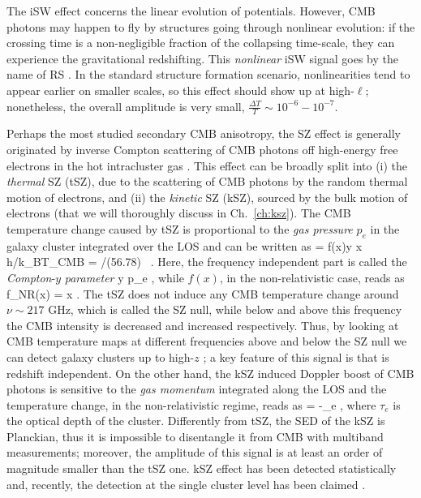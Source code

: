 The \gls{iSW} effect concerns the linear evolution of potentials. However, \gls{CMB} photons may happen 
to fly by structures going through nonlinear evolution: if the crossing time is a non-negligible fraction of the 
collapsing time-scale, they can experience the gravitational redshifting. This \emph{nonlinear} \gls{iSW} signal
goes by the name
of \gls{RS} \citep{Rees1968}. In the standard structure formation scenario, nonlinearities tend to appear earlier on smaller scales, so 
this effect should show up at high-$\ell$; nonetheless, the overall amplitude is very small, $\frac{\Delta T}{T} \sim 10^{-6}-10^{-7}$.  

Perhaps the most studied secondary \gls{CMB} anisotropy, the \gls{SZ} effect is generally originated by inverse 
Compton scattering of \gls{CMB} photons off high-energy free electrons in the hot intracluster gas \citep{Zeldovich1969,Sunyaev1970}.
This effect can be broadly split into (i) the \emph{thermal} \gls{SZ} (tSZ), due to the scattering of 
\gls{CMB} photons by the random thermal motion of electrons, and (ii) the \emph{kinetic} \gls{SZ} (kSZ),
sourced by the bulk motion of electrons (that we will thoroughly discuss in Ch.~\eqref{ch:ksz}). The 
\gls{CMB} temperature change caused by tSZ is proportional to the \emph{gas pressure} $p_e$ in the 
galaxy cluster integrated over the \gls{LOS} and can be written as
%
\be
{} = f(x)y \quad {} \quad x \equiv h\nu/k_BT_{\rm{CMB}} = \nu/(56.78) \, .
\ee
%
Here, the frequency independent part is called the \emph{Compton}-$y$ \emph{parameter}
%
\be
\label{eq:cmb_y}
y \equiv {}\int p_e \diff\ell,
\ee
%
while $f(x)$, in the non-relativistic case, reads as
%
\be
f_{\rm{NR}}(x) = x .
\ee
%
The t\gls{SZ} does not induce any \gls{CMB} temperature change around $\nu \sim 217$ GHz, which is 
called the \gls{SZ} null, while below and above this frequency the \gls{CMB} intensity is decreased and 
increased  respectively. Thus, by looking at \gls{CMB} temperature maps at different frequencies above
and below the \gls{SZ} null we can detect galaxy clusters up to high-$z$ \citep{PlanckCollaboration2015d}; a key feature of this signal is that
is redshift independent. On the other hand, the k\gls{SZ} induced Doppler boost of \gls{CMB} photons is sensitive to the 
 \emph{gas momentum} integrated along the \gls{LOS} and the temperature change, in the non-relativistic regime, reads as 
%
\be
{} = -\tau_e ,
\ee
%
where $\tau_e$ is the optical depth of the cluster. Differently from t\gls{SZ}, the \gls{SED} of the k\gls{SZ} 
is Planckian, thus it is impossible to disentangle it from \gls{CMB} with multiband measurements; 
moreover, the amplitude of this signal is at least an order of magnitude smaller than the t\gls{SZ} one.
k\gls{SZ} effect has been detected statistically \citep{Hand2012} and, recently, the detection at the 
single cluster level has been claimed \citep{Adam2016a}.
 
